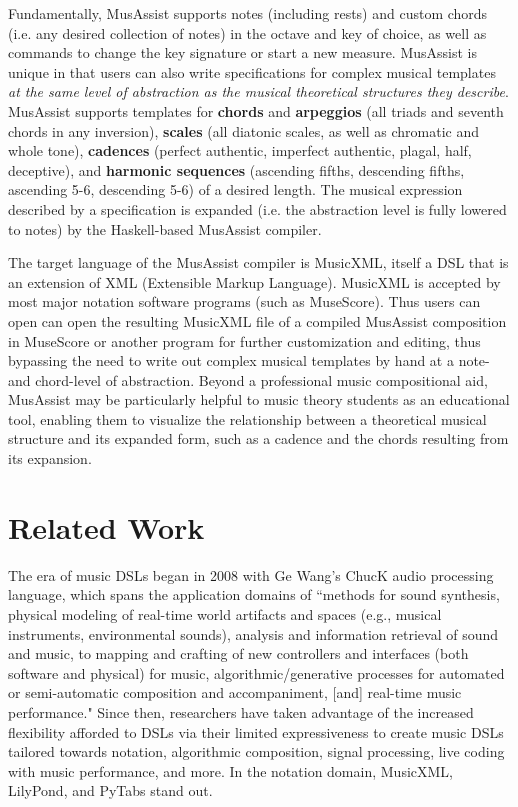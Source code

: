 \documentclass{article}
\begin{document}
Fundamentally, MusAssist supports notes (including rests) and custom chords (i.e. any desired collection of notes)
in the octave and key of choice, as well as commands to change the key signature or start a new measure.
 MusAssist is unique in that users can also write specifications for complex musical templates \textit{at the same level of abstraction
as the musical theoretical structures they describe}. MusAssist supports templates for
\textbf{chords} and \textbf{arpeggios} (all triads and seventh chords in any inversion),
\textbf{scales} (all diatonic scales, as well as chromatic and whole tone),
\textbf{cadences} (perfect authentic, imperfect authentic, plagal, half, deceptive), and 
\textbf{harmonic sequences} (ascending
fifths, descending fifths, ascending 5-6, descending 5-6) of a desired length. The musical expression 
described by a specification is expanded (i.e. the abstraction level is
fully lowered to notes) by the Haskell-based MusAssist compiler.

The target language of the MusAssist compiler is MusicXML, itself a DSL that is an extension of
XML (Extensible Markup Language). MusicXML is accepted by most major notation software programs (such as MuseScore). 
Thus users can open can open the resulting MusicXML file of a compiled MusAssist composition in MuseScore or another
program for further customization and editing, thus bypassing the need to write out complex musical templates by hand at a 
note- and chord-level of abstraction. Beyond a professional music compositional aid, MusAssist may be particularly 
helpful to music theory students as an educational tool, enabling them to visualize the relationship between a theoretical musical structure 
and its expanded form, such as a cadence and the chords resulting from its expansion.


\section{Related Work}\label{sec:related_work}

The era of music DSLs began in 2008 with Ge Wang's ChucK audio processing language, which  
spans the application domains of ``methods for sound synthesis, physical modeling of real-time world artifacts and spaces (e.g., 
musical instruments, environmental sounds), analysis and information retrieval of sound and music, to 
mapping and crafting of new controllers and interfaces (both software and physical) for music, 
algorithmic/generative processes for automated or semi-automatic composition and accompaniment, [and] 
real-time music performance." %
Since then, researchers have taken advantage of the increased flexibility afforded to DSLs via their limited expressiveness to create
music DSLs tailored towards notation, algorithmic composition, signal processing, live coding with music performance, and more. In the 
 notation domain, MusicXML, LilyPond, and PyTabs stand out.
\end{document}
